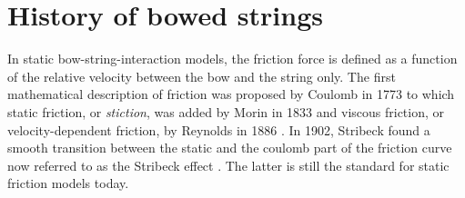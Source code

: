 \section{History of bowed strings}\label{sec:historyOfBowedStrings}

In static bow-string-interaction models, the friction force is defined as a function of the relative velocity between the bow and the string only. 
The first mathematical description of friction was proposed by Coulomb in 1773 \cite{Coulomb} to which static friction, or \textit{stiction}, was added by Morin in 1833 \cite{Morin1833} and viscous friction, or velocity-dependent friction, by Reynolds in 1886 \cite{Reynolds1886}. In 1902, Stribeck found a smooth transition between the static and the coulomb part of the friction curve now referred to as the Stribeck effect \cite{Stribeck1902}. The latter is still the standard for static friction models today.
